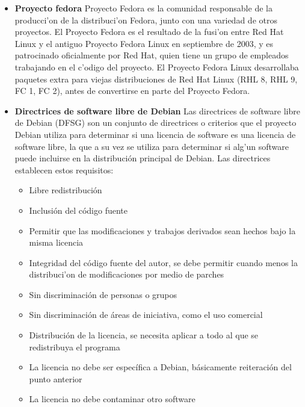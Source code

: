 \documentclass{book}
\begin{document}
\begin{itemize}
	\item {\bf Proyecto fedora}
Proyecto Fedora es la comunidad responsable de la producci'on de la distribuci'on Fedora, junto con una variedad de otros proyectos. El Proyecto Fedora es el resultado de la fusi'on entre Red Hat Linux y el antiguo Proyecto Fedora Linux en septiembre de 2003, y es patrocinado oficialmente por Red Hat, quien tiene un grupo de empleados trabajando en el c'odigo del proyecto. El Proyecto Fedora Linux desarrollaba paquetes extra para viejas distribuciones de Red Hat Linux (RHL 8, RHL 9, FC 1, FC 2), antes de convertirse en parte del Proyecto Fedora.
	\item {\bf Directrices de software libre de Debian}
Las directrices de software libre de Debian (DFSG) son un conjunto de directrices o criterios que el proyecto Debian utiliza para determinar si una licencia de software es una licencia de software libre, la que a su vez se utiliza para determinar si alg'un software puede incluirse en la distribución principal de Debian. Las directrices establecen estos requisitos:
\begin{itemize}
	\item Libre redistribuci\'on
	\item Inclusión del c\'odigo fuente
	\item Permitir que las modificaciones y trabajos derivados sean hechos bajo la misma licencia
	\item	Integridad del c\'odigo fuente del autor, se debe permitir cuando menos la distribuci'on de modificaciones por medio de parches
	\item Sin discriminaci\'on de personas o grupos
	\item Sin discriminaci\'on de áreas de iniciativa, como el uso comercial
	\item Distribuci\'on de la licencia, se necesita aplicar a todo al que se redistribuya el programa
	\item La licencia no debe ser específica a Debian, b\'asicamente reiteraci\'on del punto anterior
	\item La licencia no debe contaminar otro software
\end{itemize}
\end{itemize}
\newpage
\end{document}
